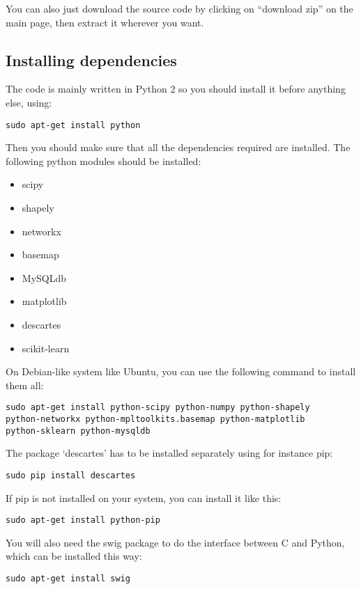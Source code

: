 \documentclass[12pt]{article}
\begin{document}
You can also just download the source code by clicking on ``download zip'' on the main page, then extract it wherever you want.

\subsection{Installing dependencies}

The code is mainly written in Python 2 so you should install it before anything else, using:

\begin{verbatim}
sudo apt-get install python
\end{verbatim}

Then you should make sure that all the dependencies required are installed. The following python modules should be installed:

\begin{itemize}
\item scipy
\item shapely
\item networkx
\item basemap
\item MySQLdb
\item matplotlib
\item descartes
\item scikit-learn
\end{itemize}

On Debian-like system like Ubuntu, you can use the following command to install them all:

\begin{verbatim}
sudo apt-get install python-scipy python-numpy python-shapely 
python-networkx python-mpltoolkits.basemap python-matplotlib 
python-sklearn python-mysqldb
\end{verbatim}

The package `descartes' has to be installed separately using for instance pip:
\begin{verbatim}
sudo pip install descartes
\end{verbatim}

If pip is not installed on your system, you can install it like this:

\begin{verbatim}
sudo apt-get install python-pip 
\end{verbatim}

You will also need the swig package to do the interface between C and Python, which can be installed this way:
\begin{verbatim}
sudo apt-get install swig
\end{verbatim}
\end{document}
